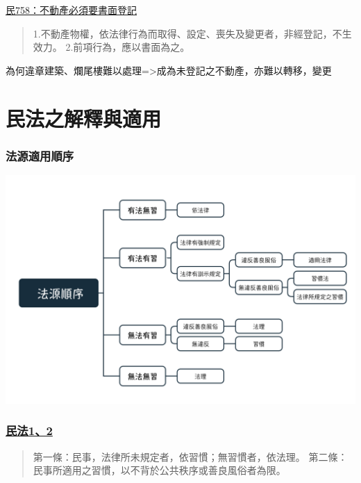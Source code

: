 \documentclass[
]{book}
\begin{document}
\href{https://law.moj.gov.tw/LawClass/LawSingle.aspx?pcode=B0000001\&flno=67}{民758：不動產必須要書面登記}

\begin{quote}
1.不動產物權，依法律行為而取得、設定、喪失及變更者，非經登記，不生效力。
2.前項行為，應以書面為之。
\end{quote}

為何違章建築、爛尾樓難以處理=\textgreater 成為未登記之不動產，亦難以轉移，變更

\hypertarget{ux6c11ux6cd5ux4e4bux89e3ux91cbux8207ux9069ux7528}{%
\chapter{民法之解釋與適用}\label{ux6c11ux6cd5ux4e4bux89e3ux91cbux8207ux9069ux7528}}

\hypertarget{ux6cd5ux6e90ux9069ux7528ux9806ux5e8f}{%
\subsection{法源適用順序}\label{ux6cd5ux6e90ux9069ux7528ux9806ux5e8f}}

\includegraphics[width=0.8\linewidth]{www/法源適用}

\hypertarget{ux6c11ux6cd512}{%
\subsection{\texorpdfstring{\href{https://law.moj.gov.tw/LawClass/LawAll.aspx?pcode=B0000001}{民法1、2}}{民法1、2}}\label{ux6c11ux6cd512}}

\begin{quote}
第一條：民事，法律所未規定者，依習慣；無習慣者，依法理。
第二條：民事所適用之習慣，以不背於公共秩序或善良風俗者為限。
\end{quote}

\pagebreak
\end{document}
